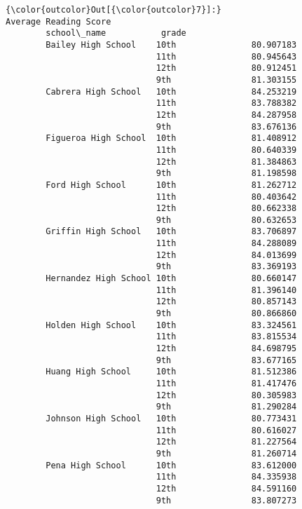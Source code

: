 \documentclass[11pt]{article}
\begin{document}
\begin{Verbatim}[commandchars=\\\{\}]
{\color{outcolor}Out[{\color{outcolor}7}]:}                              Average Reading Score
        school\_name           grade                       
        Bailey High School    10th               80.907183
                              11th               80.945643
                              12th               80.912451
                              9th                81.303155
        Cabrera High School   10th               84.253219
                              11th               83.788382
                              12th               84.287958
                              9th                83.676136
        Figueroa High School  10th               81.408912
                              11th               80.640339
                              12th               81.384863
                              9th                81.198598
        Ford High School      10th               81.262712
                              11th               80.403642
                              12th               80.662338
                              9th                80.632653
        Griffin High School   10th               83.706897
                              11th               84.288089
                              12th               84.013699
                              9th                83.369193
        Hernandez High School 10th               80.660147
                              11th               81.396140
                              12th               80.857143
                              9th                80.866860
        Holden High School    10th               83.324561
                              11th               83.815534
                              12th               84.698795
                              9th                83.677165
        Huang High School     10th               81.512386
                              11th               81.417476
                              12th               80.305983
                              9th                81.290284
        Johnson High School   10th               80.773431
                              11th               80.616027
                              12th               81.227564
                              9th                81.260714
        Pena High School      10th               83.612000
                              11th               84.335938
                              12th               84.591160
                              9th                83.807273

\end{Verbatim}
\end{document}
